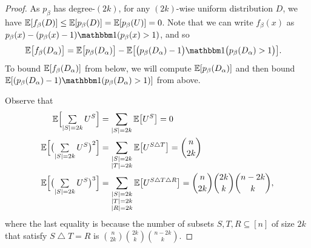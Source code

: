 \documentclass[10pt,a4paper]{article}
\theoremstyle{definition}
\newcommand{\E}{\mathop{\mathbb{E}\/}}
\newcommand{\tsum}{\mathop{{\textstyle \sum}}}
\newcommand{\bbone}{\mathbbm 1}
\newcommand{\Id}{\bbone}
\newcommand{\pmo}{\{-1,1\}}
\newcommand{\symmdiff}{\triangle} \newcommand{\symdiff}{\symmdiff}
\DeclarePairedDelimiter\abs{\lvert}{\rvert}
\def\symdiff{\bigtriangleup}
\begin{document}
  \begin{proof}
    As $p_\beta$ has degree-$(2k)$, for any $(2k)$-wise uniform distribution $D$, we have $\E[f_\beta(D)] \le \E[p_\beta(D)] = \E[p_\beta(U)] = 0$.
    Note that we can write $f_\beta(x)$ as $p_\beta(x) - (p_\beta(x)-1)\Id(p_\beta(x) > 1)$, and so
    \begin{align}
      \E\bigl[f_\beta(D_\alpha)\bigr]
      &= \E\bigl[p_\beta(D_\alpha)\bigr] - \E\bigl[\bigl(p_\beta(D_\alpha)-1\bigr) \Id\bigl(p_\beta(D_\alpha) > 1\bigr) \bigr] \label{eq:OZ-goal} .
    \end{align}
    To bound $\E[f_\beta(D_\alpha)]$ from below, we will compute $\E[p_\beta(D_\alpha)]$ and then bound $\E[(p_\beta(D_\alpha)-1) \Id(p_\beta(D_\alpha) > 1)]$ from above.

    Observe that
    \begin{align*}
    \E\Bigl[ \tsum_{\abs{S}=2k} U^S \Bigr]
    &= \sum_{\abs{S}=2k} \E\bigl [U^S \bigr] = 0 \\
    \E\Bigl[ \bigl(\tsum_{\abs{S}=2k} U^S\bigr)^2 \Bigr]
    &= \sum_{\substack{\abs{S}=2k \\ \abs{T}=2k}} \E\bigl[U^{S \symdiff T}\bigr]
    = \binom{n}{2k} \\
    \E\Bigl[ \bigl(\tsum_{\abs{S}=2k} U^S\bigr)^3 \Bigr]
    &= \sum_{\substack{\abs{S}=2k\\ \abs{T}=2k\\ \abs{R}=2k}} \E\bigl[U^{S \symdiff T \symmdiff R}\bigr]
    = \binom{n}{2k}\binom{2k}{k}\binom{n-2k}{k} ,
    \end{align*}
    where the last equality is because the number of subsets $S,T,R \subseteq [n]$ of size $2k$ that satisfy $S \symdiff T = R$ is $\binom{n}{2k}\binom{2k}{k}\binom{n-2k}{k}$.
    

\end{proof}
\end{document}
